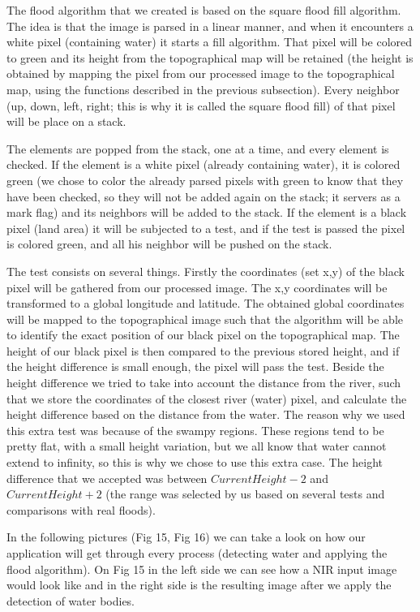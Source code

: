 \documentclass[12pt, a4paper]{report}
\begin{document}
The flood algorithm that we created is based on the square flood fill algorithm. The idea is that the image is parsed in a linear manner, and when it encounters a white pixel (containing water) it starts a fill algorithm. That pixel will be colored to green and its height from the topographical map will be retained (the height is obtained by mapping the pixel from our processed image to the topographical map, using the functions described in the previous subsection). Every neighbor (up, down, left, right; this is why it is called the square flood fill) of that pixel will be place on a stack. \par 
The elements are popped from the stack, one at a time, and every element is checked. If the element is a white pixel (already containing water), it is colored green (we chose to color the already parsed pixels with green to know that they have been checked, so they will not be added again on the stack; it servers as a mark flag) and its neighbors will be added to the stack. If the element is a black pixel (land area) it will be subjected to a test, and if the test is passed the pixel is colored green, and all his neighbor will be pushed on the stack. 
\par 
The test consists on several things. Firstly the coordinates (set x,y) of the black pixel will be gathered from our processed image. The x,y coordinates will be transformed to a global longitude and latitude. The obtained global coordinates will be mapped to the topographical image such that the algorithm will be able to identify the exact position of our black pixel on the topographical map. The height of our black pixel is then compared to the previous stored height, and if the height difference is small enough, the pixel will pass the test. Beside the height difference we tried to take into account the distance from the river, such that we store the coordinates of the closest river (water) pixel, and calculate the height difference based on the distance from the water. The reason why we used this extra test was because of the swampy regions. These regions tend to be pretty flat, with a small height variation, but we all know that water cannot extend to infinity, so this is why we chose to use this extra case. The height difference that we accepted was between \textbf{$CurrentHeight - 2$} and \textbf{$CurrentHeight + 2$} (the range was selected by us based on several tests and comparisons with real floods).
\par 
In the following pictures (Fig 15, Fig 16) we can take a look on how our application will get through every process (detecting water and applying the flood algorithm). On Fig 15 in the left side we can see how a NIR input image would look like and in the right side is the resulting image after we apply the detection of water bodies.
\end{document}
